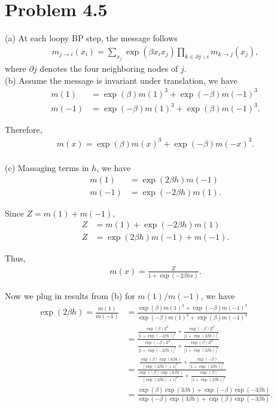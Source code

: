 \documentclass{article}
\begin{document}
 
\section*{Problem 4.5}
%
(a) At each loopy BP step, the message follows
\begin{align*}
	m_{j\to i}(x_i) = \sum_{x_j}\exp(\beta x_i x_j)\prod_{k\in \partial j \backslash i} m_{k\to j}(x_j),
\end{align*}
where $\partial j$ denotes the four neighboring nodes of $j$.
\\

\noindent
(b) Assume the message is invariant under translation, we have
\begin{align*}
	m(1) &= \exp(\beta)m(1)^3 + \exp(-\beta)m(-1)^3\\
	m(-1) &= \exp(-\beta)m(1)^3 + \exp(\beta)m(-1)^3.
\end{align*}
%

Therefore, 
\begin{align}
	m(x) = \exp(\beta)m(x)^3 + \exp(-\beta)m(-x)^3. \label{eq:5b}
\end{align}
\\

\noindent
(c) Massaging terms in $h$, we have
\begin{align*}
	m(1) &= \exp(2\beta h)m(-1)\\
	m(-1) &= \exp(-2\beta h)m(1).
\end{align*}
%

Since $Z = m(1) + m(-1)$,
\begin{align*}
	Z &= m(1) + \exp(-2\beta h)m(1)\\
	Z &= \exp(2\beta h)m(-1) + m(-1).
\end{align*}
%

Thus,
\begin{align}
	m(x) = \frac{Z}{1 + \exp(-2\beta h x)}. \label{eq:5c}
\end{align}
%

Now we plug in results from (b) for $m(1) / m(-1)$, we have
\begin{align*}
	\exp(2\beta h) = \frac{m(1)}{m(-1)} &=
	\frac{\exp(\beta)m(1)^3 + \exp(-\beta)m(-1)^3}{\exp(-\beta)m(1)^3 + \exp(\beta)m(-1)^3} \\
	&=\frac{\frac{\exp(\beta)Z^3}{\big[1 + \exp(-2\beta h)\big]^3} +
	  \frac{\exp(-\beta)Z^3}{\big[1 + \exp(2\beta h)\big]^3}}
	  {\frac{\exp(-\beta)Z^3}{\big[1 + \exp(-2\beta h)\big]^3} + 
	  \frac{\exp(\beta)Z^3}{\big[1 + \exp(2\beta h)\big]^3}}\\
	&=\frac{\frac{\exp(\beta)\exp(6\beta h)}{\big[\exp(2\beta h) + 1\big]^3} +
	  \frac{\exp(-\beta)}{\big[1 + \exp(2\beta h)\big]^3}}
	  {\frac{\exp(-\beta)\exp(6\beta h)}{\big[\exp(2\beta h) + 1\big]^3} + 
	  \frac{\exp(\beta)}{\big[1 + \exp(2\beta h)\big]^3}}\\
	&=\frac{\exp(\beta)\exp(3\beta h) +
	        \exp(-\beta)\exp(-3\beta h)}
	       {\exp(-\beta)\exp(3\beta h) +
	        \exp(\beta)\exp(-3\beta h)}.
\end{align*}
%
\end{document}
